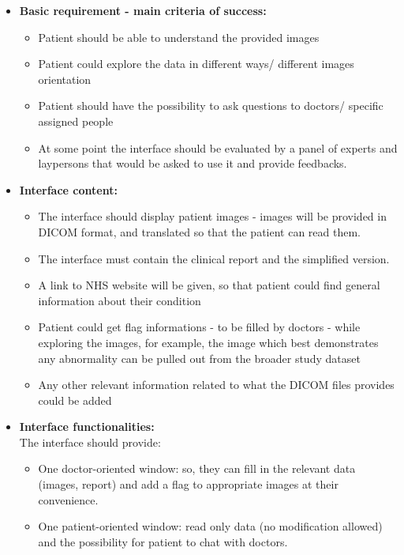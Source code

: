 \begin{itemize}	
\item \textbf{Basic requirement - main criteria of success:}
\begin{itemize}
\item Patient should be able to understand the provided images 
\item Patient could explore the data in different ways/ different images orientation
\item Patient should have the possibility to ask questions to doctors/ specific assigned people
\item At some point the interface should be evaluated by a panel of experts and laypersons that would be asked to use it and provide feedbacks.
\end{itemize}


\item \textbf{Interface content:}
\begin{itemize}
\item The interface should display patient images - images will be provided in DICOM format, and translated so that the patient can read them.
\item The interface must contain the clinical report and the simplified version.
\item A link to NHS website will be given, so that patient could find general information about their condition
\item Patient could get flag informations - to be filled by doctors - while exploring the images, for example, the image which best demonstrates any abnormality can be pulled out from the broader study dataset
\item Any other relevant information related to what the DICOM files provides could be added 
\end{itemize}


\item \textbf{Interface functionalities:}\\
The interface should provide:
\begin{itemize}
\item One doctor-oriented window: so, they can fill in the relevant data (images, report) and add a flag to appropriate images at their convenience.
\item One patient-oriented window: read only data (no modification allowed) and the possibility for patient to chat with doctors.

\end{itemize}


\end{itemize}

